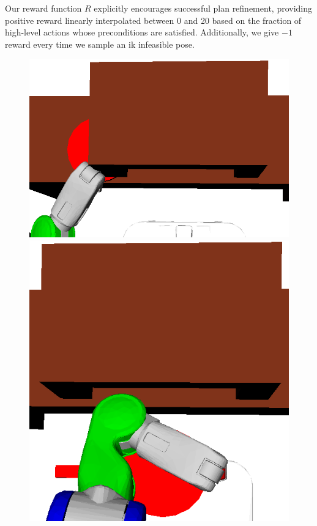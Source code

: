 Our reward function $R$ explicitly encourages successful plan refinement, providing positive reward linearly
interpolated between 0 and 20 based on the fraction of high-level actions whose preconditions are
satisfied. Additionally, we give $-1$ reward every time we sample an {\sc ik} infeasible pose.

\begin{figure}[t]
  \centering
    \noindent
    \includegraphics[scale=0.15]{images/fry_bad_grasp_pd1.png}\hspace{6mm}
    \includegraphics[scale=0.15]{images/fry_bad_grasp_pd2.png}

\end{figure}
